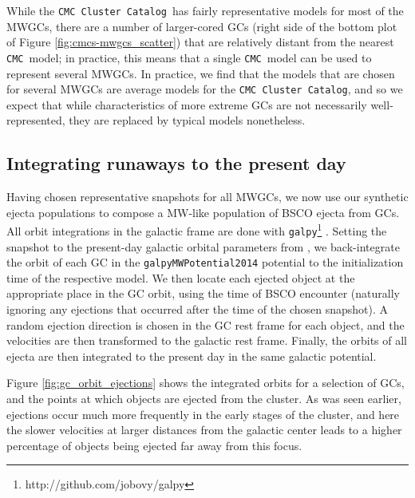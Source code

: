 \documentclass[twocolumn,linenumbers]{aastex631}
\newcommand{\CMC}{\texttt{CMC}}
\newcommand{\CMCcat}{\texttt{CMC Cluster Catalog}}
\begin{document}
While the \CMCcat\ has fairly representative models for most of the MWGCs, there are a number of larger-cored GCs (right side of the bottom plot of Figure \ref{fig:cmcs-mwgcs_scatter}) that are relatively distant from the nearest \CMC\ model; in practice, this means that a single \CMC\ model can be used to represent several MWGCs.
In practice, we find that the models that are chosen for several MWGCs are average models for the \CMCcat, and so we expect that while characteristics of more extreme GCs are not necessarily well-represented, they are replaced by typical models nonetheless.

\subsection{Integrating runaways to the present day} \label{subsec:galpy}

Having chosen representative snapshots for all MWGCs, we now use our synthetic ejecta populations to compose a MW-like population of BSCO ejecta from GCs.
All orbit integrations in the galactic frame are done with \texttt{galpy}\footnote{http://github.com/jobovy/galpy} \citep{2015ApJS..216...29B}.
Setting the snapshot to the present-day galactic orbital parameters from \citet{2018MNRAS.478.1520B}, we back-integrate the orbit of each GC in the \texttt{galpy}\texttt{MWPotential2014} potential to the initialization time of the respective model.
We then locate each ejected object at the appropriate place in the GC orbit, using the time of BSCO encounter (naturally ignoring any ejections that occurred after the time of the chosen snapshot).
A random ejection direction is chosen in the GC rest frame for each object, and the velocities are then transformed to the galactic rest frame.
Finally, the orbits of all ejecta are then integrated to the present day in the same galactic potential.

Figure \ref{fig:gc_orbit_ejections} shows the integrated orbits for a selection of GCs, and the points at which objects are ejected from the cluster.
As was seen earlier, ejections occur much more frequently in the early stages of the cluster, and here the slower velocities at larger distances from the galactic center leads to a higher percentage of objects being ejected far away from this focus.
\end{document}
